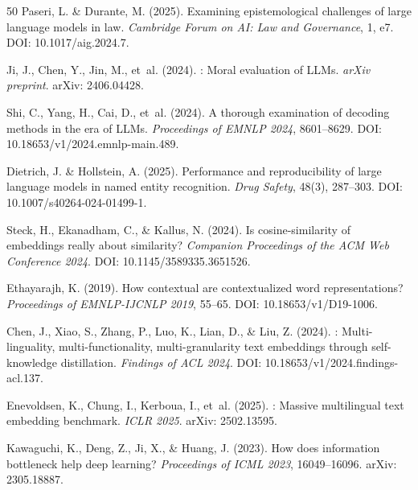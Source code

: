 \documentclass[11pt,a4paper]{article}
\begin{document}
\begin{thebibliography}{50}
Paseri, L. \& Durante, M. (2025).
\newblock Examining epistemological challenges of large language models in law.
\newblock \emph{Cambridge Forum on AI: Law and Governance}, 1, e7.
\newblock DOI: 10.1017/aig.2024.7.

Ji, J., Chen, Y., Jin, M., et~al. (2024).
: Moral evaluation of {LLMs}.
\newblock \emph{arXiv preprint}.
\newblock arXiv: 2406.04428.

Shi, C., Yang, H., Cai, D., et~al. (2024).
\newblock A thorough examination of decoding methods in the era of {LLMs}.
\newblock \emph{Proceedings of EMNLP 2024}, 8601--8629.
\newblock DOI: 10.18653/v1/2024.emnlp-main.489.

Dietrich, J. \& Hollstein, A. (2025).
\newblock Performance and reproducibility of large language models in named entity recognition.
\newblock \emph{Drug Safety}, 48(3), 287--303.
\newblock DOI: 10.1007/s40264-024-01499-1.

Steck, H., Ekanadham, C., \& Kallus, N. (2024).
\newblock Is cosine-similarity of embeddings really about similarity?
\newblock \emph{Companion Proceedings of the ACM Web Conference 2024}.
\newblock DOI: 10.1145/3589335.3651526.

Ethayarajh, K. (2019).
\newblock How contextual are contextualized word representations?
\newblock \emph{Proceedings of EMNLP-IJCNLP 2019}, 55--65.
\newblock DOI: 10.18653/v1/D19-1006.

Chen, J., Xiao, S., Zhang, P., Luo, K., Lian, D., \& Liu, Z. (2024).
: Multi-linguality, multi-functionality, multi-granularity text embeddings through self-knowledge distillation.
\newblock \emph{Findings of ACL 2024}.
\newblock DOI: 10.18653/v1/2024.findings-acl.137.

Enevoldsen, K., Chung, I., Kerboua, I., et~al. (2025).
: Massive multilingual text embedding benchmark.
\newblock \emph{ICLR 2025}.
\newblock arXiv: 2502.13595.

Kawaguchi, K., Deng, Z., Ji, X., \& Huang, J. (2023).
\newblock How does information bottleneck help deep learning?
\newblock \emph{Proceedings of ICML 2023}, 16049--16096.
\newblock arXiv: 2305.18887.


\end{thebibliography}
\end{document}
